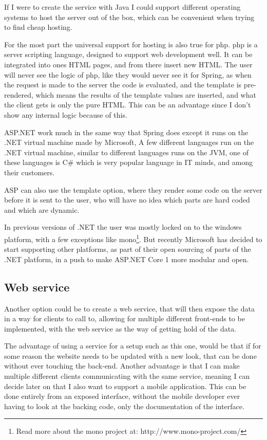 If I were to create the service with Java I could support different operating systems to host the server out of the box, which can be convenient when trying to find cheap hosting.

For the most part the universal support for hosting is also true for php. php is
a server scripting language\cite{php-home}, designed to support web development
well. It can be integrated into ones HTML pages, and from there insert new HTML.
The user will never see the logic of php, like they would never see it for
Spring, as when the request is made to the server the code is evaluated, and the
template is pre-rendered, which means the results of the template values are
inserted, and what the client gets is only the pure HTML. This can be an
advantage since I don't show any internal logic because of this. 

ASP.NET work much in the same way that Spring does except it runs on the .NET
virtual machine made by Microsoft, A few different languages run on the .NET
virtual machine, similar to different languages runs on the JVM, one of these
languages is C\# which is very popular language in IT minds, and among their
customers. 

ASP can also use the template option, where they render some code on the server
before it is sent to the user, who will have no idea which parts are hard coded
and which are dynamic. 

In previous versions of .NET the user was mostly locked on to the windows
platform, with a few exceptions like mono\footnote{Read more about the mono
  project at: http://www.mono-project.com/}. But recently Microsoft has decided
to start supporting other platforms, as part of their open sourcing of parts of
the .NET platform\cite{.net-core}, in a push to make ASP.NET Core 1 more modular and
open. 

\subsection{Web service}
\label{sub:web_service}
Another option could be to create a web service, that will then expose the data
in a way for clients to call to, allowing for multiple different front-ends to be
implemented, with the web service as the way of getting hold of the data. 

The advantage of using a service for a setup such as this one, would be that if
for some reason the website needs to be updated with a new look, that can be
done without ever touching the back-end. Another advantage is that I can make
multiple different clients communicating with the same service, meaning I can
decide later on that I also want to support a mobile application. This can be
done entirely from an exposed interface, without the mobile developer ever
having to look at the backing code, only the documentation of the interface. 

